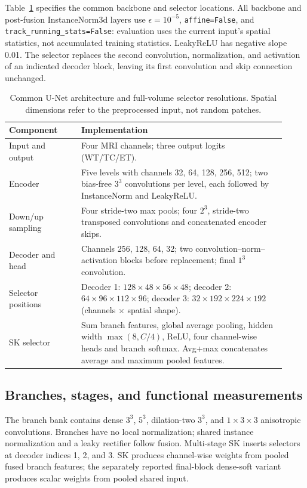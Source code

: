 \documentclass[mathematics,article,submit,pdftex,moreauthors]{Definitions/mdpi}
\begin{document}
Table~\ref{tab:architecture} specifies the common backbone and selector
locations. All backbone and post-fusion InstanceNorm3d layers use
$\epsilon=10^{-5}$, \texttt{affine=False}, and
\texttt{track\_running\_stats=False}: evaluation uses the current input's
spatial statistics, not accumulated training statistics. LeakyReLU has
negative slope 0.01. The selector replaces the second convolution,
normalization, and activation of an indicated decoder block, leaving its
first convolution and skip connection unchanged.
\begin{table}[H]
\caption{Common U-Net architecture and full-volume selector resolutions.
Spatial dimensions refer to the preprocessed input, not random patches.}
\label{tab:architecture}
\centering\small
\begin{tabular}{p{0.24\linewidth}p{0.68\linewidth}}
\toprule Component & Implementation \\
\midrule
Input and output & Four MRI channels; three output logits (WT/TC/ET). \\
Encoder & Five levels with channels 32, 64, 128, 256, 512; two bias-free
$3^3$ convolutions per level, each followed by InstanceNorm and LeakyReLU. \\
Down/up sampling & Four stride-two max pools; four $2^3$, stride-two
transposed convolutions and concatenated encoder skips. \\
Decoder and head & Channels 256, 128, 64, 32; two convolution--norm--activation
blocks before replacement; final $1^3$ convolution. \\
Selector positions & Decoder 1: $128\times48\times56\times48$;
decoder 2: $64\times96\times112\times96$;
decoder 3: $32\times192\times224\times192$ (channels $\times$ spatial shape). \\
SK selector & Sum branch features, global average pooling, hidden width
$\max(8,C/4)$, ReLU, four channel-wise heads and branch softmax.
Avg+max concatenates average and maximum pooled features. \\
\bottomrule
\end{tabular}
\end{table}

\subsection{Branches, stages, and functional measurements}
The branch bank contains dense $3^3$, $5^3$, dilation-two $3^3$, and
$1\times3\times3$ anisotropic convolutions. Branches have no local
normalization; shared instance normalization and a leaky rectifier follow
fusion. Multi-stage SK inserts selectors at decoder indices 1, 2, and 3.
SK produces channel-wise weights from pooled fused branch features; the
separately reported final-block dense-soft variant produces scalar weights
from pooled shared input.
\end{document}
